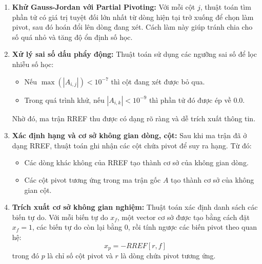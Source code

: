 \documentclass[12pt,a4paper]{article}
\begin{document}
\begin{enumerate}[label=\textbf{\alph*) Bước \arabic*:}, leftmargin=*, align=left]
\item \textbf{Khử Gauss-Jordan với Partial Pivoting:}
Với mỗi cột $j$, thuật toán tìm phần tử có giá trị tuyệt đối lớn nhất từ dòng hiện tại trở xuống để chọn làm pivot, sau đó hoán đổi lên dòng đang xét. Cách làm này giúp tránh chia cho số quá nhỏ và tăng độ ổn định số học.

\item \textbf{Xử lý sai số dấu phẩy động:}
Thuật toán sử dụng các ngưỡng sai số để lọc nhiễu số học:
\begin{itemize}[leftmargin=1.5em]
    \item Nếu $\max(|A_{i,j}|) < 10^{-7}$ thì cột đang xét được bỏ qua.
    \item Trong quá trình khử, nếu $|A_{i,k}| < 10^{-9}$ thì phần tử đó được ép về $0.0$.
\end{itemize}
Nhờ đó, ma trận RREF thu được có dạng rõ ràng và dễ trích xuất thông tin.

\item \textbf{Xác định hạng và cơ sở không gian dòng, cột:}
Sau khi ma trận đã ở dạng RREF, thuật toán ghi nhận các cột chứa pivot để suy ra hạng. Từ đó:
\begin{itemize}[leftmargin=1.5em]
    \item Các dòng khác không của RREF tạo thành cơ sở của không gian dòng.
    \item Các cột pivot tương ứng trong ma trận gốc $A$ tạo thành cơ sở của không gian cột.
\end{itemize}

\item \textbf{Trích xuất cơ sở không gian nghiệm:}
Thuật toán xác định danh sách các biến tự do. Với mỗi biến tự do $x_f$, một vector cơ sở được tạo bằng cách đặt $x_f = 1$, các biến tự do còn lại bằng $0$, rồi tính ngược các biến pivot theo quan hệ:
\begin{equation}
x_p = -RREF[r,f]
\end{equation}
trong đó $p$ là chỉ số cột pivot và $r$ là dòng chứa pivot tương ứng.
\end{enumerate}
\end{document}

